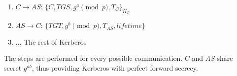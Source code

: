 \documentclass[11pt]{article}
\begin{document}
\begin{enumerate}
    \begin{enumerate}
      \item $C \to AS$: $\{ C, TGS, g^{a} \pmod{p}, T_{C} \}_{K_{C} }$
      \item $AS \to C$: $\{ TGT, g^{b} \pmod{p}, T_{AS}, lifetime \}$
      \item $\dots$ The rest of Kerberos
    \end{enumerate}

    The steps are performed for every possible communication. $C$ and $AS$ share secret $g^{ab}$, thus providing Kerberos with perfect forward secrecy.

\end{enumerate}
\end{document}
